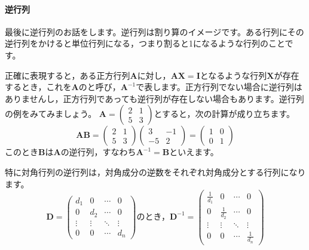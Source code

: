\documentclass{ltjsbook}
\begin{document}
\paragraph{逆行列}
最後に逆行列のお話をします。逆行列は割り算のイメージです。ある行列にその逆行列をかけると単位行列になる，つまり割ると1になるような行列のことです。

正確に表現すると，ある正方行列$\bm{A}$に対し，$\bm{A}\bm{X}=\bm{I}$となるような行列$\bm{X}$が存在するとき，これを$\bm{A}$のと呼び，$\bm{A}^{-1}$で表します。正方行列でない場合に逆行列はありませんし，正方行列であっても逆行列が存在しない場合もあります。逆行列の例をみてみましょう。
$\bm{A}=\begin{pmatrix}2&1\\5&3\end{pmatrix}$とすると，次の計算が成り立ちます。
\begin{equation*}
    \bm{AB}=\begin{pmatrix}2&1\\5&3\end{pmatrix}\begin{pmatrix}3&-1\\-5&2\end{pmatrix}=\begin{pmatrix}1&0\\0&1\end{pmatrix}
\end{equation*}
このとき$\bm{B}$は$\bm{A}$の逆行列，すなわち$\bm{A}^{-1}=\bm{B}$といえます。

特に対角行列の逆行列は，対角成分の逆数をそれぞれ対角成分とする行列になります。
\begin{equation*}
\bm{D} = \begin{pmatrix} d_1 & 0 		& \cdots & 0 \\
					    0  & d_2	& \cdots & 0\\
					\vdots & \vdots & \ddots & \vdots \\
						 0 & 0 		& \cdots & d_n \end{pmatrix}
\mbox{のとき，}
\bm{D}^{-1} = \begin{pmatrix} \frac{1}{d_1} 	& 0 			& \cdots & 0 \\
							0 				& \frac{1}{d_2} & \cdots & 0 \\
							\vdots 			& \vdots 		& \ddots & \vdots \\
							0 				& 0 			& \cdots & \frac{1}{d_n} \end{pmatrix}
\end{equation*}
\end{document}
